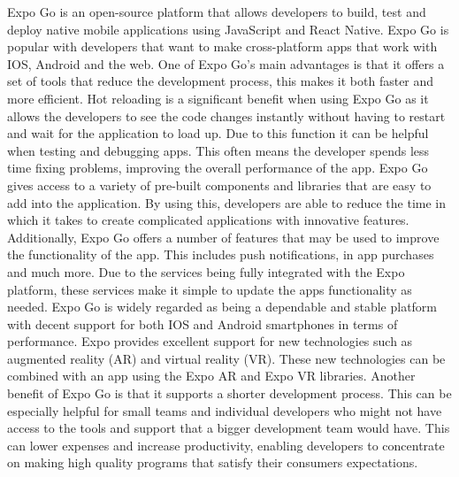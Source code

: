 Expo Go is an open-source platform that allows developers to build, test and deploy native mobile applications using JavaScript and React Native. \cite{expoGo} Expo Go is popular with developers that want to make cross-platform apps that work with IOS, Android and the web.
\newline \newline
One of Expo Go’s main advantages is that it offers a set of tools that reduce the development process, this makes it both faster and more efficient. Hot reloading is a significant benefit when using Expo Go as it allows the developers to see the code changes instantly without having to restart and wait for the application to load up. Due to this function it can be helpful when testing and debugging apps. This often means the developer spends less time fixing problems, improving the overall performance of the app.
\newline \newline
Expo Go gives access to a variety of pre-built components and libraries that are easy to add into the application. By using this, developers are able to reduce the time in which it takes to create complicated applications with innovative features. Additionally, Expo Go offers a number of features that may be used to improve the functionality of the app. This includes push notifications, in app purchases and much more. Due to the services being fully integrated with the Expo platform, these services make it simple to update the apps functionality as needed.
\newline \newline
Expo Go is widely regarded as being a dependable and stable platform with decent support for both IOS and Android smartphones in terms of performance. Expo provides excellent support for new technologies such as augmented reality (AR) and virtual reality (VR). These new technologies can be combined with an app using the Expo AR and Expo VR libraries. 
\newline \newline
Another benefit of Expo Go is that it supports a shorter development process. This can be especially helpful for small teams and individual developers who might not have access to the tools and support that a bigger development team would have. This can lower expenses and increase productivity, enabling developers to concentrate on making high quality programs that satisfy their consumers expectations. 
\newline \newline
